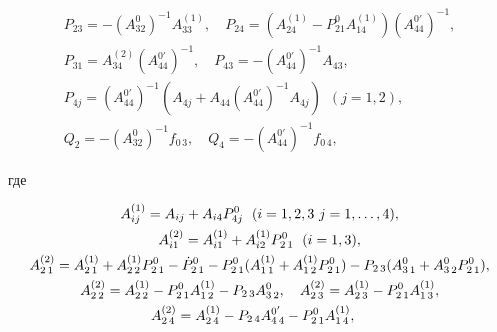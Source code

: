 \begin{pf}
\begin{gather*}
% 


P_{23}=-(A^0_{32})^{-1}A^{(1)}_{33}, \quad 


P_{24}=(A^{(1)}_{24}-P^0_{21}A^{(1)}_{14}) 


(A^{0'}_{44})^{-1}, \\ 


% 


P_{31}=A^{(2)}_{34}(A^{0'}_{44})^{-1},\quad 


P_{43}=-(A^{0'}_{44})^{-1}A_{43}, \\ 


% 


P_{4j}=(A^{0'}_{44})^{-1}(A_{4j}+A_{44} 


(A^{0'}_{44})^{-1}A_{4j}) \ \; (j=1,2), \\ 


Q_2=-(A^0_{32})^{-1}f_{0\,3},\quad 


Q_4=-(A^{0'}_{44})^{-1}f_{0\,4}, 


\end{gather*} 


где 


\begin{gather*} 


\allowdisplaybreaks 


A^{(1)}_{ij}=A_{ij}+A_{i4}P^0_{4j} \ \; (i=1,2,3 \ j=1,\dotsc,4), \\ 


% 


A^{(2)}_{i1}=A^{(1)}_{i1}+A^{(1)}_{i2}P^0_{2\,1} \ \; (i=1,3), \\ 


% 


A^{(2)}_{2\,1}=A^{(1)}_{2\,1}+A^{(1)}_{2\,2}P^0_{2\,1}- 


\Dot P^0_{2\,1}-P^0_{2\,1}(A^{(1)}_{1\,1}+ 


A^{(1)}_{1\,2}P^0_{2\,1})-P_{2\,3}(A^0_{3\,1}+ 


A^0_{3\,2}P^0_{2\,1}), \\ 


% 


A^{(2)}_{2\,2}=A^{(1)}_{2\,2}-P^0_{2\,1}A^{(1)}_{1\,2}- 


P_{2\,3}A^{0}_{3\,2},\quad 


A^{(2)}_{2\,3}=A^{(1)}_{2\,3}-P^0_{2\,1}A^{(1)}_{1\,3},\\ 


% 


A^{(2)}_{2\,4}=A^{(1)}_{2\,4}-P_{2\,4}A^{0'}_{4\,4}- 


P^0_{2\,1}A^{(1)}_{1\,4},\quad 



\end{gather*}
\end{pf}
